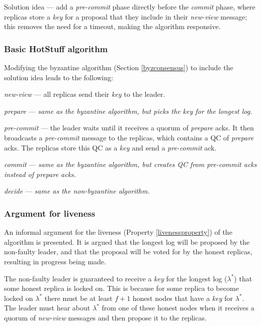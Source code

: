 Solution idea --- add a \textit{pre-commit} phase directly before the \textit{commit} phase, where replicas store a \textit{key} for a proposal that they include in their \textit{new-view} message; this removes the need for a timeout, making the algorithm responsive.

\subsubsection{Basic HotStuff algorithm}

Modifying the byzantine algorithm (Section \ref{byzconsensus}) to include the solution idea leads to the following:

\begin{description}
	\item \textit{new-view} --- all replicas send their \textit{key} to the leader.
	\item \textit{prepare} ---  \textit{same as the byzantine algorithm, but picks the key for the longest log.}
	\item \textit{pre-commit} --- the leader waits until it receives a quorum of \textit{prepare} acks. It then broadcasts a \textit{pre-commit} message to the replicas, which contains a QC of \textit{prepare} acks. The replicas store this QC as a \textit{key} and send a \textit{pre-commit} ack.
	\item \textit{commit} --- \textit{same as the byzantine algorithm, but creates QC from pre-commit acks instead of prepare acks.}
	\item \textit{decide} --- \textit{same as the non-byzantine algorithm.}
\end{description}

\subsubsection{Argument for liveness} \label{livenessargument}
An informal argument for the liveness (Property \ref{livenessproperty}) of the algorithm is presented. It is argued that the longest log will be proposed by the non-faulty leader, and that the proposal will be voted for by the honest replicas, resulting in progress being made.

The non-faulty leader is guaranteed to receive a \textit{key} for the longest log ($\lambda^*$) that some honest replica is locked on. This is because for some replica to become locked on $\lambda^*$ there must be at least $f + 1$ honest nodes that have a \textit{key} for $\lambda^*$. The leader must hear about $\lambda^*$ from one of these honest nodes when it receives a quorum of \textit{new-view} messages and then propose it to the replicas.

